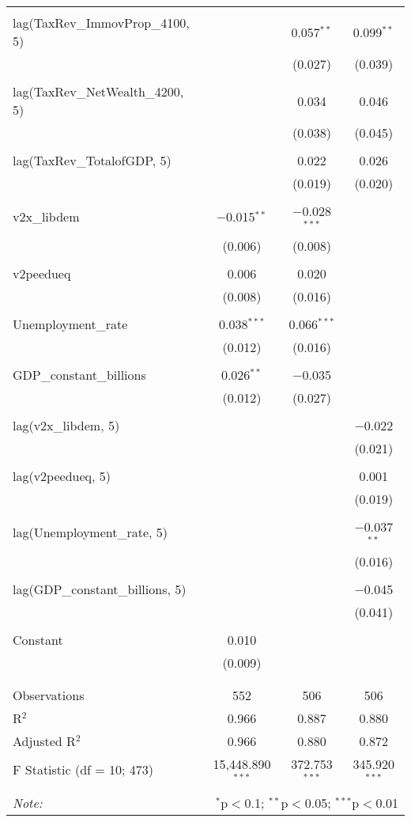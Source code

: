 \begin{table}[!htbp]
\begin{tabular}{@{\extracolsep{5pt}}lccc}
  & & & \\ 
 lag(TaxRev\_ImmovProp\_4100, 5) &  & 0.057$^{**}$ & 0.099$^{**}$ \\ 
  &  & (0.027) & (0.039) \\ 
  & & & \\ 
 lag(TaxRev\_NetWealth\_4200, 5) &  & 0.034 & 0.046 \\ 
  &  & (0.038) & (0.045) \\ 
  & & & \\ 
 lag(TaxRev\_TotalofGDP, 5) &  & 0.022 & 0.026 \\ 
  &  & (0.019) & (0.020) \\ 
  & & & \\ 
 v2x\_libdem & $-$0.015$^{**}$ & $-$0.028$^{***}$ &  \\ 
  & (0.006) & (0.008) &  \\ 
  & & & \\ 
 v2peedueq & 0.006 & 0.020 &  \\ 
  & (0.008) & (0.016) &  \\ 
  & & & \\ 
 Unemployment\_rate & 0.038$^{***}$ & 0.066$^{***}$ &  \\ 
  & (0.012) & (0.016) &  \\ 
  & & & \\ 
 GDP\_constant\_billions & 0.026$^{**}$ & $-$0.035 &  \\ 
  & (0.012) & (0.027) &  \\ 
  & & & \\ 
 lag(v2x\_libdem, 5) &  &  & $-$0.022 \\ 
  &  &  & (0.021) \\ 
  & & & \\ 
 lag(v2peedueq, 5) &  &  & 0.001 \\ 
  &  &  & (0.019) \\ 
  & & & \\ 
 lag(Unemployment\_rate, 5) &  &  & $-$0.037$^{**}$ \\ 
  &  &  & (0.016) \\ 
  & & & \\ 
 lag(GDP\_constant\_billions, 5) &  &  & $-$0.045 \\ 
  &  &  & (0.041) \\ 
  & & & \\ 
 Constant & 0.010 &  &  \\ 
  & (0.009) &  &  \\ 
  & & & \\ 
\hline \\[-1.8ex] 
Observations & 552 & 506 & 506 \\ 
R$^{2}$ & 0.966 & 0.887 & 0.880 \\ 
Adjusted R$^{2}$ & 0.966 & 0.880 & 0.872 \\ 
F Statistic (df = 10; 473) & 15,448.890$^{***}$ & 372.753$^{***}$ & 345.920$^{***}$ \\ 
\hline 
\hline \\[-1.8ex] 
\textit{Note:}  & \multicolumn{3}{r}{$^{*}$p$<$0.1; $^{**}$p$<$0.05; $^{***}$p$<$0.01} \\ 
\end{tabular} 
\end{table} 
